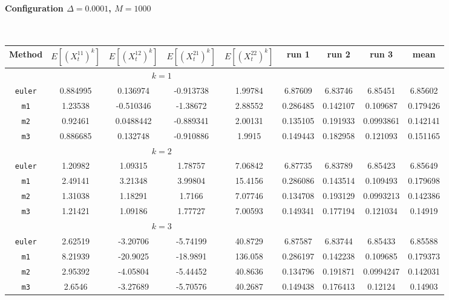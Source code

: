 \paragraph*{Configuration $\Delta=0.0001$, $M=1000$}\hfill\\
\begin{tabular}{@{}*{9}{c}@{}}
Method & $E[(X^{11}_t)^k]$ & $E[(X^{12}_t)^k]$ & $E[(X^{21}_t)^k]$ & $E[(X^{22}_t)^k]$ & run 1 & run 2 & run 3 & mean\\
\hline
\multicolumn{6}{c}{$k=1$}\\
\verb+euler+ & 0.884995 & 0.136974 & -0.913738 & 1.99784 & 6.87609 & 6.83746 & 6.85451 & 6.85602 \\
 \verb+m1+ & 1.23538 & -0.510346 & -1.38672 & 2.88552 & 0.286485 & 0.142107 & 0.109687 & 0.179426 \\
 \verb+m2+ & 0.92461 & 0.0488442 & -0.889341 & 2.00131 & 0.135105 & 0.191933 & 0.0993861 & 0.142141 \\
 \verb+m3+ & 0.886685 & 0.132748 & -0.910886 & 1.9915 & 0.149443 & 0.182958 & 0.121093 & 0.151165 \\
\hline
\multicolumn{6}{c}{$k=2$}\\
\verb+euler+ & 1.20982 & 1.09315 & 1.78757 & 7.06842 & 6.87735 & 6.83789 & 6.85423 & 6.85649 \\
 \verb+m1+ & 2.49141 & 3.21348 & 3.99804 & 15.4156 & 0.286086 & 0.143514 & 0.109493 & 0.179698 \\
 \verb+m2+ & 1.31038 & 1.18291 & 1.7166 & 7.07746 & 0.134708 & 0.193129 & 0.0993213 & 0.142386 \\
 \verb+m3+ & 1.21421 & 1.09186 & 1.77727 & 7.00593 & 0.149341 & 0.177194 & 0.121034 & 0.14919 \\
\hline
\multicolumn{6}{c}{$k=3$}\\
\verb+euler+ & 2.62519 & -3.20706 & -5.74199 & 40.8729 & 6.87587 & 6.83744 & 6.85433 & 6.85588 \\
 \verb+m1+ & 8.21939 & -20.9025 & -18.9891 & 136.058 & 0.286197 & 0.142238 & 0.109685 & 0.179373 \\
 \verb+m2+ & 2.95392 & -4.05804 & -5.44452 & 40.8636 & 0.134796 & 0.191871 & 0.0994247 & 0.142031 \\
 \verb+m3+ & 2.6546 & -3.27689 & -5.70576 & 40.2687 & 0.149438 & 0.176413 & 0.12124 & 0.14903 
\end{tabular}\hfill\\

